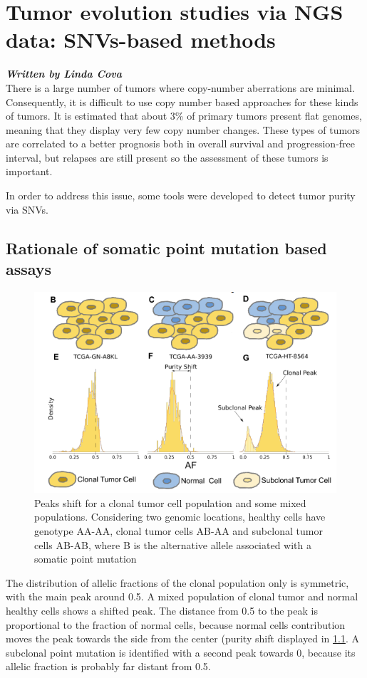 \graphicspath{{chapters/TumorEvolution3Images/}}

\chapter{Tumor evolution studies via NGS data: SNVs-based methods}

\textbf{\textit{Written by Linda Cova}}\\

There is a large number of tumors where copy-number aberrations are minimal.
Consequently, it is difficult to use copy number based approaches for these
kinds of tumors. It is estimated that about 3\% of primary tumors present flat
genomes, meaning that they display very few copy number changes. These types of
tumors are correlated to a better prognosis both in overall survival and
progression-free interval, but relapses are still present so the assessment of
these tumors is important.

In order to address this issue, some tools were developed to detect tumor purity
via SNVs.

\section{Rationale of somatic point mutation based assays}

\begin{figure}[!ht]
\centering
    \includegraphics[width=0.5\linewidth]{peaks.png}
    \caption{\label{fig:peaks}Peaks shift for a clonal tumor cell population and
    some mixed populations. Considering two genomic locations, healthy cells
    have genotype AA-AA, clonal tumor cells AB-AA and subclonal tumor cells
    AB-AB, where B is the alternative allele associated with a somatic point
    mutation}
\end{figure}

The distribution of allelic fractions of the clonal population only is
symmetric, with the main peak around 0.5. A mixed population of clonal tumor and
normal healthy cells shows a shifted peak. The distance from 0.5 to the peak is
proportional to the fraction of normal cells, because normal cells contribution
moves the peak towards the side from the center (purity shift displayed in
\ref{fig:peaks}. A subclonal point mutation is identified with a second peak
towards 0, because its allelic fraction is probably far distant from 0.5.

